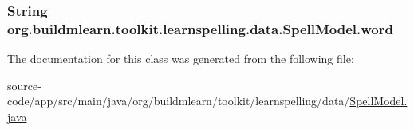 \subsubsection[{\texorpdfstring{word}{word}}]{\setlength{\rightskip}{0pt plus 5cm}String org.\+buildmlearn.\+toolkit.\+learnspelling.\+data.\+Spell\+Model.\+word\hspace{0.3cm}{\ttfamily [private]}}\hypertarget{classorg_1_1buildmlearn_1_1toolkit_1_1learnspelling_1_1data_1_1SpellModel_adc2fd1639db2de59172fe451e6660c16}{}\label{classorg_1_1buildmlearn_1_1toolkit_1_1learnspelling_1_1data_1_1SpellModel_adc2fd1639db2de59172fe451e6660c16}


The documentation for this class was generated from the following file\+:\begin{DoxyCompactItemize}
\item 
source-\/code/app/src/main/java/org/buildmlearn/toolkit/learnspelling/data/\hyperlink{SpellModel_8java}{Spell\+Model.\+java}\end{DoxyCompactItemize}
